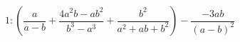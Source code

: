 \begin{ex}[type=expression]
	\begin{condition}
		\( 1:\left( \dfrac{a}{a-b}+\dfrac{4a^2b-ab^2}{b^3-a^3}+\dfrac{b^2}{a^2+ab+b^2} \right) -\dfrac{-3ab}{(a-b)^2}\)
	\end{condition}
\end{ex}